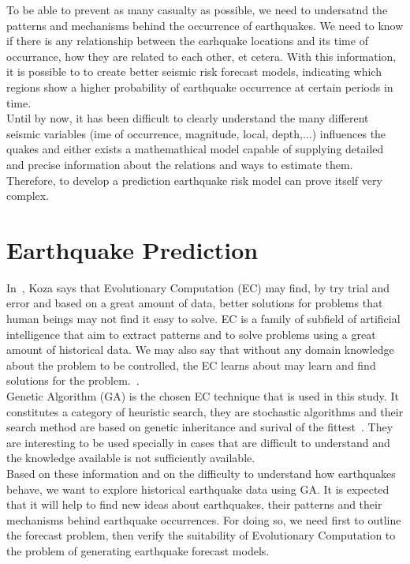 To be able to prevent as many casualty as possible, we need to undersatnd the patterns and mechanisms behind the occurrence of earthquakes. We need to know if there is any relationship between the earhquake locations and its time of occurrance, how they are related to each other, et cetera. With this information, it is possible to to create better seismic risk forecast models, indicating which regions show a higher probability of earthquake occurrence at certain periods in time. \\

Until by now, it has been difficult to clearly understand the many different seismic variables (ime of occurrence, magnitude, local, depth,...) influences the quakes and either exists a mathemathical model capable of supplying detailed and precise information about the relations and ways to estimate them. Therefore, to develop a prediction earthquake risk model can prove itself very complex.\\

\section{Earthquake Prediction}
In~\cite{Koza2003}, Koza says that Evolutionary Computation (EC) may find, by try trial and error and based on a great amount of data, better solutions for problems that human beings may not find it easy to solve. EC is a family of subfield of artificial intelligence that aim to extract patterns and to solve problems using a great amount of historical data. We may also say that without any domain knowledge about the problem to be controlled, the EC learns about may learn and find solutions for the problem.~\cite{Michie94machinelearning}.\\

Genetic Algorithm (GA) is the chosen EC technique that is used in this study. It constitutes a category of heuristic search, they are stochastic algorithms and their search method are based on genetic inheritance and surival of the fittest~\cite{michalewicz1996heuristic}. They are interesting to be used specially in cases that are difficult to understand and the knowledge available is not sufficiently available.\\

Based on these information and on the difficulty to understand how earthquakes behave, we want to explore historical earthquake data using GA. It is expected that it will help to find new ideas about earthquakes, their patterns and their mechanisms behind earthquake occurrences. For doing so, we need first to outline the forecast problem, then verify the suitability of Evolutionary Computation to the problem of generating earthquake forecast models.\\


